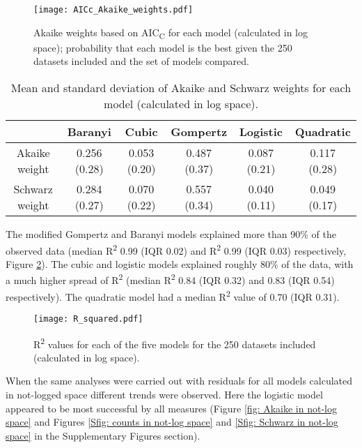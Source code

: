 \documentclass[11pt]{article}
\begin{document}
\begin{linenumbers}
        \begin{figure}[ht!]
            \centering
            \texttt{[image: AICc\_Akaike\_weights.pdf]}
            \caption{Akaike weights based on AIC\textsubscript{C} for each model (calculated in log space); probability that each model is the best given the 250 datasets included and the set of models compared.}
            \label{fig: Akaike in log space}
        \end{figure}
        
        \begin{table}[ht!]
        \caption{Mean and standard deviation of Akaike and Schwarz weights for each model (calculated in log space).}
        \begin{center}
        \begin{tabular}{c||c|c|c|c|c}
             & Baranyi & Cubic & Gompertz & Logistic & Quadratic\\
            \hline
            \hline
            Akaike weight & 0.256 (0.28) & 0.053 (0.20) & 0.487 (0.37) & 0.087 (0.21) & 0.117 (0.28) \\
            Schwarz weight & 0.284 (0.27) & 0.070 (0.22) & 0.557 (0.34) & 0.040 (0.11) & 0.049 (0.17)
        \end{tabular}
        \end{center}
        \label{table: Akaike and Schwarz weights}
        \end{table}

        The modified Gompertz and Baranyi models explained more than 90\% of the observed data (median R\textsuperscript{2} 0.99 (IQR 0.02) and R\textsuperscript{2} 0.99 (IQR 0.03) respectively, Figure \ref{fig: R squared}). The cubic and logistic models explained roughly 80\% of the data, with a much higher spread of R\textsuperscript{2} (median R\textsuperscript{2} 0.84 (IQR 0.32) and 0.83 (IQR 0.54) respectively). The quadratic model had a median R\textsuperscript{2} value of 0.70 (IQR 0.31). 
        
        \begin{figure}[ht!]
            \centering
            \texttt{[image: R\_squared.pdf]}
            \caption{R\textsuperscript{2} values for each of the five models for the 250 datasets included (calculated in log space).}
            \label{fig: R squared}
        \end{figure}
        
        When the same analyses were carried out with residuals for all models calculated in not-logged space different trends were observed. Here the logistic model appeared to be most successful by all measures (Figure \ref{fig: Akaike in not-log space} and Figures \ref{Sfig: counts in not-log space} and \ref{Sfig: Schwarz in not-log space} in the Supplementary Figures section).
        

\end{linenumbers}
\end{document}
